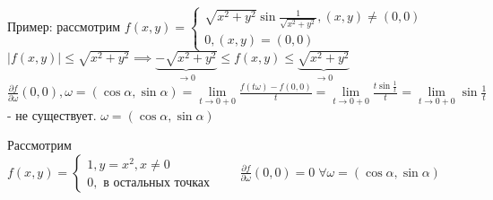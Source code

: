 \documentclass[../main.tex]{subfiles}
\begin{document}
Пример: рассмотрим $f(x,y) = \begin{cases}
    \sqrt{x^{2}+y^{2}} \sin{\frac{1}{\sqrt{x^{2}+y^{2}}}},(x,y) \neq (0,0) \\
    0, (x,y) = (0,0)
\end{cases}$\\
\vspace{0.2cm}
$|f(x,y)|\leqslant \sqrt{x^{2}+y^{2}}\implies \underbrace{-\sqrt{x^{2}+y^{2}}}_{\to 0}\leqslant f(x,y)\leqslant \underbrace{\sqrt{x^{2}+y^{2}}}_{\to 0}$
\\ $\frac{\partial{f}}{\partial{\omega}}(0,0), \omega = (\cos{\alpha},\sin{\alpha})= \lim\limits_{t \to 0+0} \frac{f(t\omega)-f(0,0)}{t} = \lim\limits_{t \to 0+0} \frac{t\sin{\frac{1}{t}}}{t} =\lim\limits_{t\to 0+0} \sin{\frac{1}{t}}$ - не существует. $\omega = (\cos{\alpha},\sin{\alpha})$

Рассмотрим $f(x,y) = \begin{cases}
    1, y= x^{2} ,x\neq 0 \\
    0, \text{ в остальных точках}
\end{cases} \qquad \frac{\partial{f}}{\partial{\omega}}(0,0)=0\; \forall \omega = (\cos{\alpha},\sin{\alpha})$ 
\end{document}
